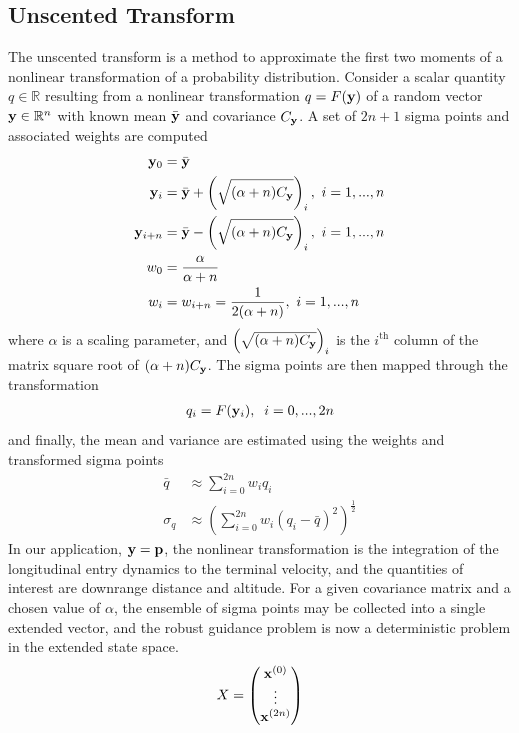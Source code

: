 \subsection{Unscented Transform}\label{Sub:UT}
The unscented transform is a method to approximate the first two moments of a nonlinear transformation of a probability distribution. Consider a scalar quantity $q\in\mathbb{R}$ resulting from a nonlinear transformation $q = F(\mathbf{y})$ of a random vector $\mathbf{y}\in\mathbb{R}^n$ with known mean $ \bar{\mathbf{y}} $ and covariance $ C_{\mathbf{y}} $. A set of $2n+1$ sigma points and associated weights are computed 
\begin{align*}
	\mathbf{y}_0 &= \bar{\mathbf{y}} \\
	\mathbf{y}_i &=  \bar{\mathbf{y}} + \left(\sqrt{(\alpha+n) C_{\mathbf{y}}}\right)_i,\, \,i=1,...,n \\
	\mathbf{y}_{i+n} &=  \bar{\mathbf{y}} - \left(\sqrt{(\alpha+n)C_{\mathbf{y}}}\right)_i, \, \,i=1,...,n\\
	w_0 &= \frac{\alpha}{\alpha+n} \\
	w_i &= w_{i+n} = \frac{1}{2(\alpha+n)}, \, \,i=1,...,n
\end{align*}
where $\alpha$ is a scaling parameter, and $\left(\sqrt{(\alpha+n)C_{\mathbf{y}}}\right)_i$ is the $i^{\mathrm{th}}$ column of the matrix square root of $(\alpha+n) C_{\mathbf{y}}$. The sigma points are then mapped through the transformation
\begin{align}
	q_i = F(\mathbf{y}_i),\;\;i=0,...,2n
\end{align}
and finally, the mean and variance are estimated using the weights and transformed sigma points
\begin{align*}
	\bar{q} &\approx \sum_{i=0}^{2n}w_iq_i\\
	\sigma_{q} &\approx \left(\sum_{i=0}^{2n}w_i\left(q_i - \bar{q}\right)^2\right)^{\frac{1}{2}}
\end{align*}
In our application, $\mathbf{y}=\mathbf{p}$, the nonlinear transformation is the integration of the longitudinal entry dynamics to the terminal velocity, and the quantities of interest are downrange distance and altitude. For a given covariance matrix and a chosen value of $\alpha$, the ensemble of sigma points may be collected into a single extended vector, and the robust guidance problem is now a deterministic problem in the extended state space.
\begin{align}
	X = \begin{pmatrix}
	\mathbf{x}^{(0)}\\
	\vdots\\
	\mathbf{x}^{(2n)}
	\end{pmatrix}
\end{align}
